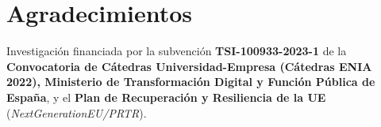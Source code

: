 \section*{Agradecimientos} %

Investigación financiada por la subvención \textbf{TSI-100933-2023-1} de la \textbf{Convocatoria de Cátedras Universidad-Empresa (Cátedras ENIA 2022), Ministerio de Transformación Digital y Función Pública de España}, y el \textbf{Plan de Recuperación y Resiliencia de la UE} (\textit{NextGenerationEU/PRTR}).